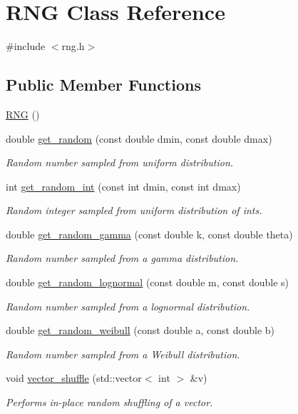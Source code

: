 \hypertarget{classRNG}{}\section{R\+NG Class Reference}
\label{classRNG}


{\ttfamily \#include $<$rng.\+h$>$}

\subsection*{Public Member Functions}
\begin{DoxyCompactItemize}
\item 
\hyperlink{classRNG_a0028b717ff3d402a5829fc09ab1c5ed4}{R\+NG} ()
\item 
double \hyperlink{classRNG_a9c2ed7323632e3bade78543f3455d055}{get\+\_\+random} (const double dmin, const double dmax)
\begin{DoxyCompactList}\small\item\em Random number sampled from uniform distribution. \end{DoxyCompactList}\item 
int \hyperlink{classRNG_a9f4c1cb8ca99c2838de7077f2a0c48ef}{get\+\_\+random\+\_\+int} (const int dmin, const int dmax)
\begin{DoxyCompactList}\small\item\em Random integer sampled from uniform distribution of ints. \end{DoxyCompactList}\item 
double \hyperlink{classRNG_ad4c8f00da1722cad6c57873ecc45187d}{get\+\_\+random\+\_\+gamma} (const double k, const double theta)
\begin{DoxyCompactList}\small\item\em Random number sampled from a gamma distribution. \end{DoxyCompactList}\item 
double \hyperlink{classRNG_a45c08c830077f4ad9c9a41ec2ab36021}{get\+\_\+random\+\_\+lognormal} (const double m, const double s)
\begin{DoxyCompactList}\small\item\em Random number sampled from a lognormal distribution. \end{DoxyCompactList}\item 
double \hyperlink{classRNG_ae7be35e443ee86c915b32fdfc2595187}{get\+\_\+random\+\_\+weibull} (const double a, const double b)
\begin{DoxyCompactList}\small\item\em Random number sampled from a Weibull distribution. \end{DoxyCompactList}\item 
void \hyperlink{classRNG_ad1fb3455e12c12637e74c9673984496d}{vector\+\_\+shuffle} (std\+::vector$<$ int $>$ \&v)
\begin{DoxyCompactList}\small\item\em Performs in-\/place random shuffling of a vector. \end{DoxyCompactList}\end{DoxyCompactItemize}


